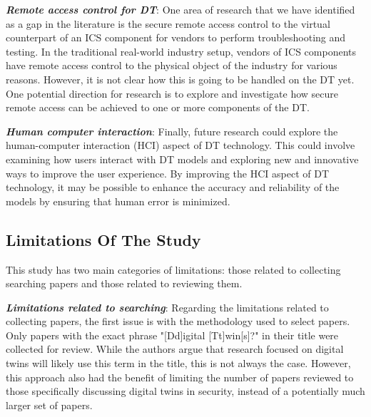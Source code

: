 
\textbf{\textit{Remote access control for DT}}: One area of research that we have identified as a gap in the literature is the secure remote access control to the virtual counterpart of an ICS component for vendors to perform troubleshooting and testing. In the traditional real-world industry setup, vendors of ICS components have remote access control to the physical object of the industry for various reasons. However, it is not clear how this is going to be handled on the DT yet. One potential direction for research is to explore and investigate how secure remote access can be achieved to one or more components of the DT.

\textbf{\textit{Human computer interaction}}: Finally, future research could explore the human-computer interaction (HCI) aspect of DT technology. This could involve examining how users interact with DT models and exploring new and innovative ways to improve the user experience. By improving the HCI aspect of DT technology, it may be possible to enhance the accuracy and reliability of the models by ensuring that human error is minimized.

\subsection{Limitations Of The Study}
% 
This study has two main categories of limitations: those related to collecting searching papers and those related to reviewing them.

\textbf{\textit{Limitations related to searching}}: Regarding the limitations related to collecting papers, the first issue is with the methodology used to select papers. Only papers with the exact phrase "[Dd]igital [Tt]win[s]?" in their title were collected for review. While the authors argue that research focused on digital twins will likely use this term in the title, this is not always the case. However, this approach also had the benefit of limiting the number of papers reviewed to those specifically discussing digital twins in security, instead of a potentially much larger set of papers. 

